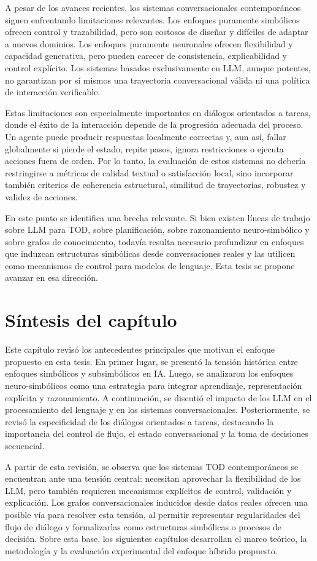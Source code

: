 A pesar de los avances recientes, los sistemas conversacionales contemporáneos siguen
enfrentando limitaciones relevantes. Los enfoques puramente simbólicos ofrecen control
y trazabilidad, pero son costosos de diseñar y difíciles de adaptar a nuevos dominios.
Los enfoques puramente neuronales ofrecen flexibilidad y capacidad generativa, pero
pueden carecer de consistencia, explicabilidad y control explícito. Los sistemas basados
exclusivamente en \ac{LLM}, aunque potentes, no garantizan por sí mismos una trayectoria
conversacional válida ni una política de interacción verificable.

Estas limitaciones son especialmente importantes en diálogos orientados a tareas,
donde el éxito de la interacción depende de la progresión adecuada del proceso. Un
agente puede producir respuestas localmente correctas y, aun así, fallar globalmente si
pierde el estado, repite pasos, ignora restricciones o ejecuta acciones fuera de orden.
Por lo tanto, la evaluación de estos sistemas no debería restringirse a métricas de
calidad textual o satisfacción local, sino incorporar también criterios de coherencia
estructural, similitud de trayectorias, robustez y validez de acciones.

En este punto se identifica una brecha relevante. Si bien existen líneas de trabajo sobre
\ac{LLM} para \ac{TOD}, sobre planificación, sobre razonamiento neuro-simbólico y sobre
grafos de conocimiento, todavía resulta necesario profundizar en enfoques que induzcan
estructuras simbólicas desde conversaciones reales y las utilicen como mecanismos de
control para modelos de lenguaje. Esta tesis se propone avanzar en esa dirección.

\section{Síntesis del capítulo}

Este capítulo revisó los antecedentes principales que motivan el enfoque propuesto en
esta tesis. En primer lugar, se presentó la tensión histórica entre enfoques simbólicos
y subsimbólicos en \ac{IA}. Luego, se analizaron los enfoques neuro-simbólicos como
una estrategia para integrar aprendizaje, representación explícita y razonamiento. A
continuación, se discutió el impacto de los \ac{LLM} en el procesamiento del lenguaje y
en los sistemas conversacionales. Posteriormente, se revisó la especificidad de los
diálogos orientados a tareas, destacando la importancia del control de flujo, el estado
conversacional y la toma de decisiones secuencial.

A partir de esta revisión, se observa que los sistemas \ac{TOD} contemporáneos se
encuentran ante una tensión central: necesitan aprovechar la flexibilidad de los \ac{LLM},
pero también requieren mecanismos explícitos de control, validación y explicación.
Los grafos conversacionales inducidos desde datos reales ofrecen una posible vía para
resolver esta tensión, al permitir representar regularidades del flujo de diálogo y
formalizarlas como estructuras simbólicas o procesos de decisión. Sobre esta base, los
siguientes capítulos desarrollan el marco teórico, la metodología y la evaluación
experimental del enfoque híbrido propuesto.
